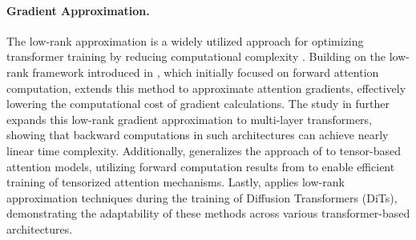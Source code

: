 \paragraph{Gradient Approximation.}
The low-rank approximation is a widely utilized approach for optimizing transformer training by reducing computational complexity \cite{lss+24,lssz24_tat,as24b,hwsl24,cls+24,lss+24_grad}. Building on the low-rank framework introduced in \cite{as23}, which initially focused on forward attention computation, \cite{as24b} extends this method to approximate attention gradients, effectively lowering the computational cost of gradient calculations. The study in \cite{lss+24} further expands this low-rank gradient approximation to multi-layer transformers, showing that backward computations in such architectures can achieve nearly linear time complexity. Additionally, \cite{lssz24_tat} generalizes the approach of \cite{as24b} to tensor-based attention models, utilizing forward computation results from \cite{as24_iclr} to enable efficient training of tensorized attention mechanisms. Lastly, \cite{hwsl24} applies low-rank approximation techniques during the training of Diffusion Transformers (DiTs), demonstrating the adaptability of these methods across various transformer-based architectures.
